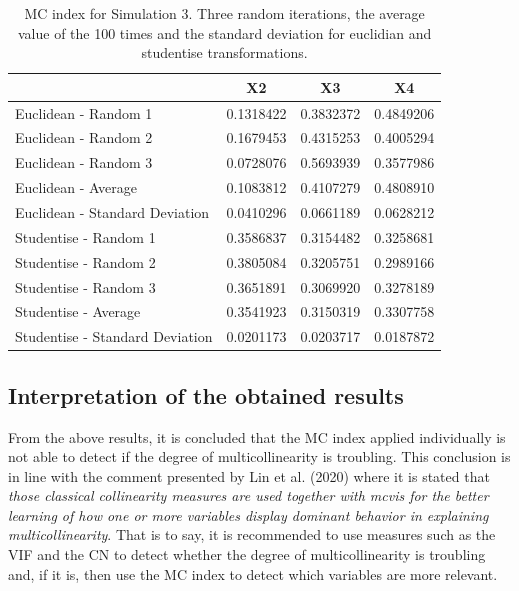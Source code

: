 \begin{table}

\caption{\label{tab:Simulation3randomlatex}MC index for Simulation 3. Three random iterations, the average value of the 100 times and the standard deviation for euclidian and studentise transformations.}
\centering
\begin{tabular}[t]{l|c|c|c}
\hline
  & X2 & X3 & X4\\
\hline
Euclidean - Random 1 & 0.1318422 & 0.3832372 & 0.4849206\\
\hline
Euclidean - Random 2 & 0.1679453 & 0.4315253 & 0.4005294\\
\hline
Euclidean - Random 3 & 0.0728076 & 0.5693939 & 0.3577986\\
\hline
Euclidean - Average & 0.1083812 & 0.4107279 & 0.4808910\\
\hline
Euclidean - Standard Deviation & 0.0410296 & 0.0661189 & 0.0628212\\
\hline
Studentise - Random 1 & 0.3586837 & 0.3154482 & 0.3258681\\
\hline
Studentise - Random 2 & 0.3805084 & 0.3205751 & 0.2989166\\
\hline
Studentise - Random 3 & 0.3651891 & 0.3069920 & 0.3278189\\
\hline
Studentise - Average & 0.3541923 & 0.3150319 & 0.3307758\\
\hline
Studentise - Standard Deviation & 0.0201173 & 0.0203717 & 0.0187872\\
\hline
\end{tabular}
\end{table}

\hypertarget{interpretation-of-the-obtained-results}{%
\subsection{Interpretation of the obtained results}\label{interpretation-of-the-obtained-results}}

From the above results, it is concluded that the MC index applied individually is not able to detect if the degree of multicollinearity is troubling. This conclusion is in line with the comment presented by Lin et al. (2020) where it is stated that \emph{those classical collinearity measures are used together with mcvis for the better learning of how one or more variables display dominant behavior in explaining multicollinearity}. That is to say, it is recommended to use measures such as the VIF and the CN to detect whether the degree of multicollinearity is troubling and, if it is, then use the MC index to detect which variables are more relevant.

